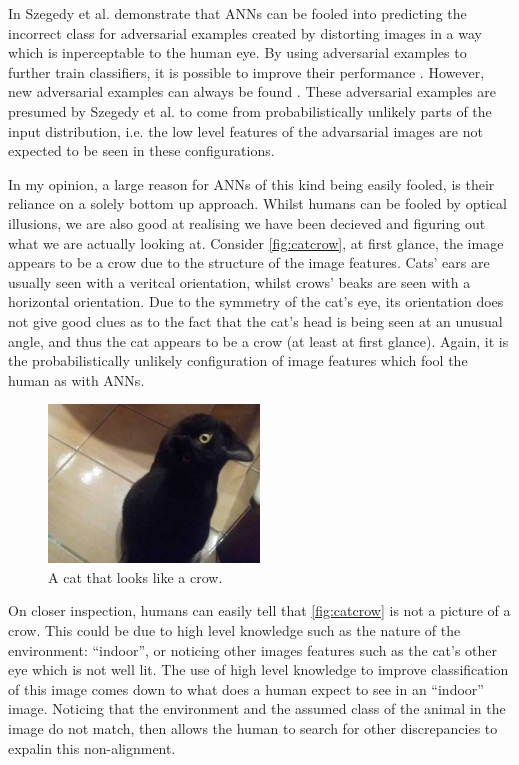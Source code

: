 In \cite{szegedy2013intriguing} Szegedy et al. demonstrate that \acp{ANN} can be fooled into predicting the incorrect class for adversarial examples created by distorting images in a way which is inperceptable to the human eye. By using adversarial examples to further train classifiers, it is possible to improve their performance \cite{moosavi2016deepfool}. However, new adversarial examples can always be found \cite{nguyen2015deep}. These adversarial examples are presumed by Szegedy et al. to come from probabilistically unlikely parts of the input distribution, i.e. the low level features of the advarsarial images are not expected to be seen in these configurations.

In my opinion, a large reason for \acp{ANN} of this kind being easily fooled, is their reliance on a solely bottom up approach. Whilst humans can be fooled by optical illusions, we are also good at realising we have been decieved and figuring out what we are actually looking at. Consider \autoref{fig:catcrow}, at first glance, the image appears to be a crow due to the structure of the image features. Cats' ears are usually seen with a veritcal orientation, whilst crows' beaks are seen with a horizontal orientation. Due to the symmetry of the cat's eye, its orientation does not give good clues as to the fact that the cat's head is being seen at an unusual angle, and thus the cat appears to be a crow (at least at first glance). Again, it is the probabilistically unlikely configuration of image features which fool the human as with \acp{ANN}.

\begin{figure}
\centering
\includegraphics[width=0.5\textwidth]{Figs/litReview/catcrow.jpeg}
\caption{A cat that looks like a crow.}
\label{fig:catcrow}

\end{figure}

On closer inspection, humans can easily tell that \autoref{fig:catcrow} is not a picture of a crow. This could be due to high level knowledge such as the nature of the environment: ``indoor'', or noticing other images features such as the cat's other eye which is not well lit. The use of high level knowledge to improve classification of this image comes down to what does a human expect to see in an ``indoor'' image. Noticing that the environment and the assumed class of the animal in the image do not match, then allows the human to search for other discrepancies to expalin this non-alignment.

